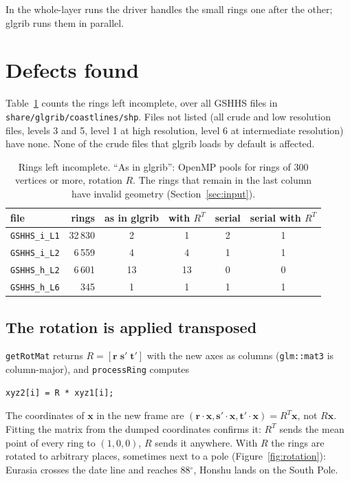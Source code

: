 \documentclass[11pt,a4paper]{article}
\newcommand{\code}[1]{\texttt{#1}}
\newcommand{\vx}{\mathbf{x}}
\begin{document}
In the whole-layer runs the driver handles the small rings one after the other; glgrib runs them
in parallel.

\section{Defects found}
\label{sec:defects}

Table~\ref{tab:failures} counts the rings left incomplete, over all GSHHS files in
\code{share/glgrib/coastlines/shp}. Files not listed (all crude and low resolution files, levels
3 and 5, level 1 at high resolution, level 6 at intermediate resolution) have none. None of the
crude files that glgrib loads by default is affected.

\begin{table}[!htb]
\centering\small
\begin{tabular}{lrcccc}
\toprule
file & rings & as in glgrib & with $R^T$ & serial & serial with $R^T$ \\
\midrule
\code{GSHHS\_i\_L1} & 32\,830 & 2 & 1 & 2 & 1 \\
\code{GSHHS\_i\_L2} &  6\,559 & 4 & 4 & 1 & 1 \\
\code{GSHHS\_h\_L2} &  6\,601 & 13 & 13 & 0 & 0 \\
\code{GSHHS\_h\_L6} &     345 & 1 & 1 & 1 & 1 \\
\bottomrule
\end{tabular}
\caption{Rings left incomplete. ``As in glgrib'': OpenMP pools for rings of 300 vertices or more,
rotation $R$. The rings that remain in the last column have invalid geometry
(Section~\ref{sec:input}).}
\label{tab:failures}
\end{table}

\subsection{The rotation is applied transposed}
\label{sec:rotation}

\code{getRotMat} returns $R=[\mathbf r\;\mathbf s'\;\mathbf t']$ with the new axes as columns
(\code{glm::mat3} is column-major), and \code{processRing} computes
\begin{lstlisting}
xyz2[i] = R * xyz1[i];
\end{lstlisting}
The coordinates of $\vx$ in the new frame are $(\mathbf r\cdot\vx,\mathbf s'\cdot\vx,
\mathbf t'\cdot\vx) = R^T\vx$, not $R\vx$. Fitting the matrix from the dumped coordinates confirms
it: $R^T$ sends the mean point of every ring to $(1,0,0)$, $R$ sends it anywhere. With $R$ the
rings are rotated to arbitrary places, sometimes next to a pole (Figure~\ref{fig:rotation}):
Eurasia crosses the date line and reaches 88$^\circ$, Honshu lands on the South Pole.
\end{document}
